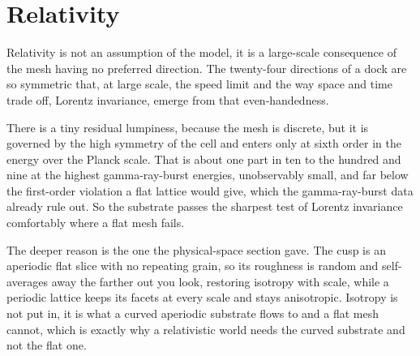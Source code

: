 \section{Relativity}

Relativity is not an assumption of the model, it is a large-scale consequence of the mesh having no preferred
direction. The twenty-four directions of a dock are so symmetric that, at large scale, the speed limit and the way space
and time trade off, Lorentz invariance, emerge from that even-handedness.

There is a tiny residual lumpiness, because the mesh is discrete, but it is governed by the high symmetry of the cell
and enters only at sixth order in the energy over the Planck scale. That is about one part in ten to the hundred and
nine at the highest gamma-ray-burst energies, unobservably small, and far below the first-order violation a flat lattice
would give, which the gamma-ray-burst data already rule out. So the substrate passes the sharpest test of Lorentz
invariance comfortably where a flat mesh fails.

The deeper reason is the one the physical-space section gave. The cusp is an aperiodic flat slice with no repeating
grain, so its roughness is random and self-averages away the farther out you look, restoring isotropy with scale, while
a periodic lattice keeps its facets at every scale and stays anisotropic. Isotropy is not put in, it is what a curved
aperiodic substrate flows to and a flat mesh cannot, which is exactly why a relativistic world needs the curved
substrate and not the flat one.
